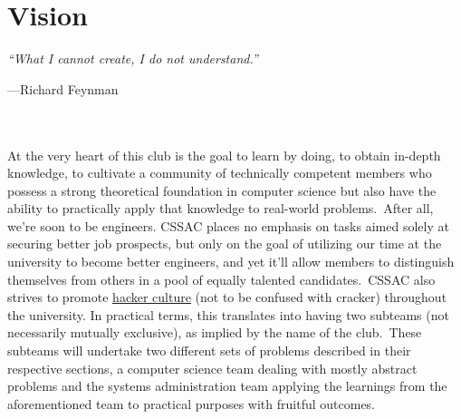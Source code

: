 \documentclass[a4paper,11pt,twocolumn,oneside]{book}
\begin{document}
    \section{Vision}\label{sec:vision}
    \emph{``What I cannot create, I do not understand.''}{\par\hfill\small{---Richard Feynman}}
    \\\\
    At the very heart of this club is the goal to learn by doing, to obtain in-depth knowledge, to cultivate a community
    of technically competent members who possess a strong theoretical foundation in computer science but also have the
    ability to practically apply that knowledge to real-world problems.\ After all, we're soon to be engineers.
    CSSAC places no emphasis on tasks aimed solely at securing better job prospects, but only on the goal of
    utilizing our time at the university to become better engineers, and yet it'll allow members to distinguish
    themselves from others in a pool of equally talented candidates.\ CSSAC also strives to promote
    \href{https://wikipedia.org/wiki/Hacker_culture}{\color{blue}\underline{hacker culture}} (not to be confused with
    cracker) throughout the university.
    In practical terms, this translates into having two subteams (not necessarily mutually exclusive), as implied by the
    name of the club.\ These subteams will undertake two different sets of problems described in their respective
    sections, a computer science team dealing with mostly abstract problems and the systems administration team applying
    the learnings from the aforementioned team to practical purposes with fruitful outcomes.


\end{document}
